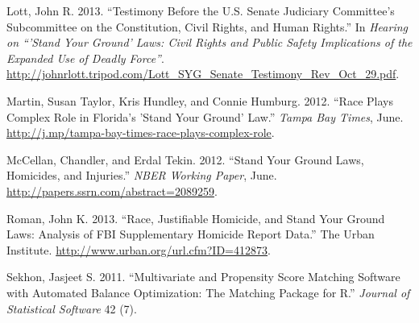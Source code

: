 \documentclass[12pt,article]{article}
\begin{document}
Lott, John R. 2013. ``Testimony Before the U.S. Senate Judiciary
Committee's Subcommittee on the Constitution, Civil Rights, and Human
Rights.'' In \emph{Hearing on ``'Stand Your Ground' Laws: Civil Rights
and Public Safety Implications of the Expanded Use of Deadly Force''}.
\url{http://johnrlott.tripod.com/Lott_SYG_Senate_Testimony_Rev_Oct_29.pdf}.

Martin, Susan Taylor, Kris Hundley, and Connie Humburg. 2012. ``Race
Plays Complex Role in Florida's 'Stand Your Ground' Law.'' \emph{Tampa
Bay Times}, June.
\url{http://j.mp/tampa-bay-times-race-plays-complex-role}.

McCellan, Chandler, and Erdal Tekin. 2012. ``Stand Your Ground Laws,
Homicides, and Injuries.'' \emph{NBER Working Paper}, June.
\url{http://papers.ssrn.com/abstract=2089259}.

Roman, John K. 2013. ``Race, Justifiable Homicide, and Stand Your Ground
Laws: Analysis of FBI Supplementary Homicide Report Data.'' The Urban
Institute. \url{http://www.urban.org/url.cfm?ID=412873}.

Sekhon, Jasjeet S. 2011. ``Multivariate and Propensity Score Matching
Software with Automated Balance Optimization: The Matching Package for
R.'' \emph{Journal of Statistical Software} 42 (7).
\end{document}

